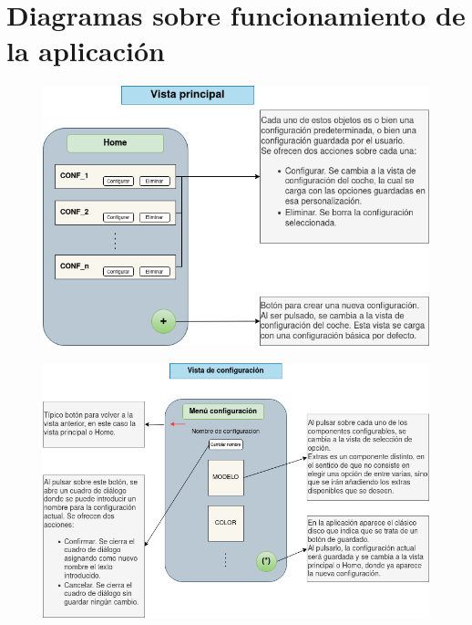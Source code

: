 
\section{Diagramas sobre funcionamiento de la aplicación}


\begin{figure}[H]
\centering
\includegraphics[scale=0.55]{imagenes/main_view.drawio.png}
\end{figure}

\begin{figure}[H]
\centering
\includegraphics[scale=0.55]{imagenes/conf_view.drawio.png}
\end{figure}


